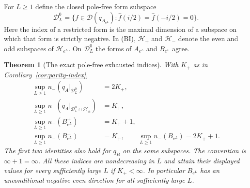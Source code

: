 \documentclass[11pt]{article}
\newtheorem{theorem}{Theorem}
\theoremstyle{remark}\newtheorem{remark}[theorem]{Remark}
\begin{document}
For $L\ge1$ define the closed pole-free form subspace
\[
 \mathcal D_L^0=\{f\in\mathcal D(q_{A_{e^L}}):
                  \widehat f(i/2)=\widehat f(-i/2)=0\}.
\]
Here the index of a restricted form is the maximal dimension
of a subspace on which that form is strictly negative.
In (BI), $\mathcal H_+$ and $\mathcal H_-$ denote the even and
odd subspaces of $\mathcal H_{e^L}$.
On $\mathcal D_L^0$ the forms of $A_{e^L}$ and $B_{e^L}$ agree.

\begin{theorem}[The exact pole-free exhausted indices]
\label{thm:pole-free-index}
With $K_+$ as in Corollary~\ref{cor:parity-index},
\[
 \begin{split}
 \sup_{L\ge1}n_-(q_A|_{\mathcal D_L^0})&=2K_+,\\
 \sup_{L\ge1}n_-(q_A|_{\mathcal D_L^0\cap\mathcal H_\pm})&=K_+,\\
 \sup_{L\ge1}n_-(B_{e^L}^+)&=K_++1,\\
 \sup_{L\ge1}n_-(B_{e^L}^-)&=K_+,\qquad
 \sup_{L\ge1}n_-(B_{e^L})=2K_++1 .
 \end{split}                                                 \tag{BI}
\]
The first two identities also hold for $q_B$ on the same subspaces.
The convention is $\infty+1=\infty$.
All these indices are nondecreasing in $L$ and attain their
displayed values for every sufficiently large $L$ if $K_+<\infty$.
In particular $B_{e^L}$ has an unconditional negative even
direction for all sufficiently large $L$.
\end{theorem}
\end{document}
